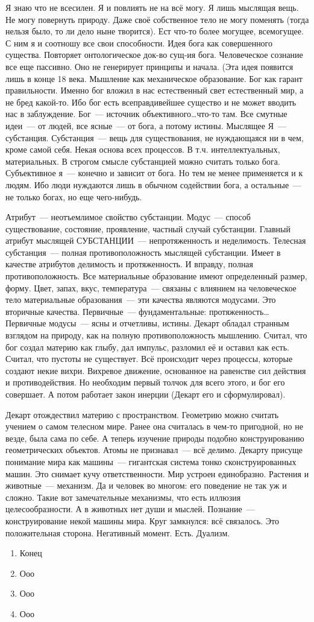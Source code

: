 Я знаю что не всесилен. Я и повлиять не на всё могу. Я лишь мыслящая вещь. Не могу повернуть природу. Даже своё собственное тело не могу поменять (тогда нельзя было, то ли дело ныне творится). Ест что-то более могущее, всемогущее. С ним я и соотношу все свои способности. Идея бога как совершенного существа. Повторяет онтологическое док-во сущ-ия бога.
Человеческое сознание все еще пассивно. Оно не генерирует принципы и начала. (Эта идея появится лишь в конце 18 века. Мышление как механическое образование. Бог как гарант правильности. Именно бог вложил в нас естественный свет естественный мир, а не бред какой-то. Ибо бог есть всеправдивейшее существо и не может вводить нас в заблуждение. Бог~--- источник объективного\ldots что-то там.
Все смутные идеи~--- от людей, все ясные~--- от бога, а потому истины. Мыслящее Я~--- субстанция.
Субстанция~--- вещь для существования, не нуждающаяся ни в чем, кроме самой себя. Некая основа всех процессов. В т.ч. интеллектуальных, материальных. В строгом смысле субстанцией можно считать только бога. Субъективное я~--- конечно и зависит от бога. Но тем не менее применяется и к людям. Ибо люди нуждаются лишь в обычном содействии бога, а остальные~--- не только богах, но еще чего-нибудь.

Атрибут~--- неотъемлимое свойство субстанции. Модус~--- способ существование, состояние, проявление, частный случай субстанции. Главный атрибут мыслящей СУБСТАНЦИИ~--- непротяженность и неделимость. Телесная субстанция~--- полная противоположность мыслящей субстанции. Имеет в качестве атрибутов делимость и протяженность. И вправду, полная противоположность. Все материальные образование имеют определенный размер, форму. Цвет, запах, вкус, температура~--- связаны с влиянием на человеческое тело материальные образования~--- эти качества являются модусами. Это вторичные качества. Первичные~--- фундаментальные: протяженность\ldots 
Первичные модусы~--- ясны и отчетливы, истины.
Декарт обладал странным взглядом на природу, как на полную противоположность мышлению. Считал, что бог создал материю как глыбу, дал импульс, разломил её и оставил как есть. Считал, что пустоты не существует. Всё происходит через процессы, которые создают некие вихри. Вихревое движение, основанное на равенстве сил действия и противодействия. Но необходим первый толчок для всего этого, и бог его совершает. А потом работает закон инерции (Декарт его и сформулировал). 

Декарт отождествил материю с пространством. Геометрию можно считать учением о самом телесном мире. Ранее она считалась в чем-то пригодной, но не везде, была сама по себе. А теперь изучение природы подобно конструированию геометрических объектов. Атомы не признавал~--- всё делимо. Декарту присуще понимание мира как машины~--- гигантская система тонко сконструированных машин. Это снимает кучу ответственности. Мир устроен единобразно. Растения и животные~--- механизм. Да и человек во многом: его поведение не так уж и сложно. Такие вот замечательные механизмы, что есть иллюзия целесообразности. А в животных нет души и мыслей. Познание~--- конструирование некой машины мира. Круг замкнулся: всё связалось. Это положительная сторона.
Негативный момент. Есть. Дуализм.

\begin{enumerate}
	\item Конец
	\item Ооо
	\item Ооо
	\item Ооо
\end{enumerate}
